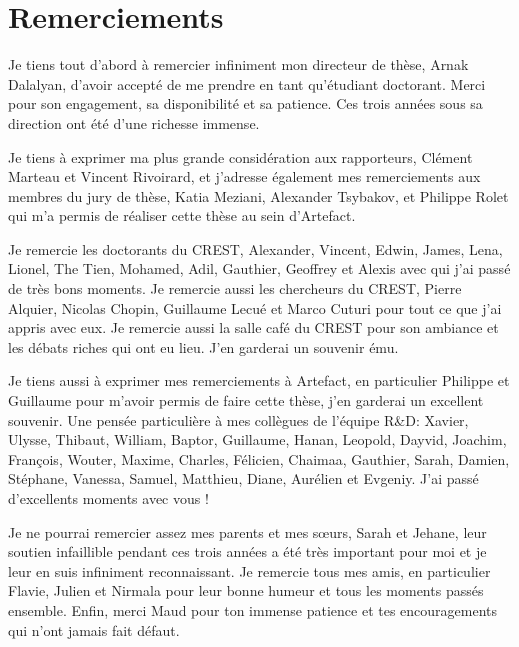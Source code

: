 \chapter*{Remerciements}

Je tiens tout d'abord à remercier infiniment mon directeur de thèse, Arnak Dalalyan, d'avoir accepté de me prendre en tant qu'étudiant doctorant. Merci pour son engagement, sa disponibilité et sa patience. Ces trois années sous sa direction ont été d'une richesse immense.

Je tiens à exprimer ma plus grande considération aux rapporteurs, Clément Marteau et Vincent Rivoirard, et j'adresse également mes remerciements aux membres du jury de thèse, Katia Meziani, Alexander Tsybakov, et Philippe Rolet qui m'a permis de réaliser cette thèse au sein d'Artefact.

Je remercie les doctorants du CREST, Alexander, Vincent, Edwin, James, Lena, Lionel, The Tien, Mohamed, Adil, Gauthier, Geoffrey et Alexis avec qui j'ai passé de très bons moments.
Je remercie aussi les chercheurs du CREST, Pierre Alquier, Nicolas Chopin, Guillaume Lecué et Marco Cuturi pour tout ce que j'ai appris avec eux. Je remercie aussi la salle café du CREST pour son ambiance et les débats riches qui ont eu lieu. J'en garderai un souvenir ému.

Je tiens aussi à exprimer mes remerciements à Artefact, en particulier Philippe et Guillaume pour m'avoir permis de faire cette thèse, j'en garderai un excellent souvenir. Une pensée particulière à mes collègues de l'équipe R\&D: Xavier, Ulysse, Thibaut, William, Baptor, Guillaume, Hanan, Leopold, Dayvid, Joachim, François, Wouter, Maxime, Charles, Félicien, Chaimaa, Gauthier, Sarah, Damien, Stéphane, Vanessa, Samuel, Matthieu, Diane, Aurélien et Evgeniy. J'ai passé d'excellents moments avec vous !

Je ne pourrai remercier assez mes parents et mes sœurs, Sarah et Jehane, leur soutien infaillible pendant ces trois années a été très important pour moi et je leur en suis infiniment reconnaissant.
Je remercie tous mes amis, en particulier Flavie, Julien et Nirmala pour leur bonne humeur et tous les moments passés ensemble.
Enfin, merci Maud pour ton immense patience et tes encouragements qui n'ont jamais fait défaut.
